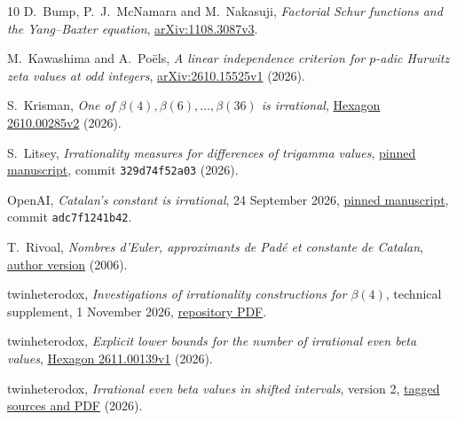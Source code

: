 \begingroup\small
\begin{thebibliography}{10}
 D.~Bump, P.~J.~McNamara and M.~Nakasuji,
\emph{Factorial Schur functions and the Yang--Baxter equation},
\href{https://arxiv.org/abs/1108.3087v3}{arXiv:1108.3087v3}.

 M.~Kawashima and A.~Po\"els,
\emph{A linear independence criterion for $p$-adic Hurwitz zeta values
at odd integers},
\href{https://arxiv.org/abs/2610.15525v1}{arXiv:2610.15525v1} (2026).

 S.~Krisman,
\emph{One of $\beta(4),\beta(6),\ldots,\beta(36)$ is irrational},
\href{https://hexagonmath.org/2610.00285v2}{Hexagon 2610.00285v2} (2026).

 S.~Litsey,
\emph{Irrationality measures for differences of trigamma values},
\href{https://github.com/slitsey/catalan-irrationality-measure/blob/329d74f52a0319af0886726271707a818022e1e0/paper-trigamma/trigamma-irrationality.pdf}{pinned manuscript},
commit \texttt{329d74f52a03} (2026).

 OpenAI, \emph{Catalan's constant is irrational},
24 September 2026,
\href{https://github.com/openai/math/blob/adc7f1241b42e322a6451854ab7e4b4c146bf78a/preprints/Catalans-constant-is-irrational-September-24-2026/paper.pdf}{pinned manuscript},
commit \texttt{adc7f1241b42}.

 T.~Rivoal,
\emph{Nombres d'Euler, approximants de Pad\'e et constante de Catalan},
\href{https://rivoal.perso.math.cnrs.fr/articles/gnew6.pdf}{author version} (2006).

 twinheterodox,
\emph{Investigations of irrationality constructions for $\beta(4)$},
technical supplement, 1 November 2026,
\href{https://github.com/twinheterodox/beta4/blob/main/output/pdf/beta4-investigations.pdf}{repository PDF}.

 twinheterodox,
\emph{Explicit lower bounds for the number of irrational even beta values},
\href{https://hexagonmath.org/2611.00139v1}{Hexagon 2611.00139v1} (2026).

 twinheterodox,
\emph{Irrational even beta values in shifted intervals}, version 2,
\href{https://github.com/twinheterodox/beta4/tree/shifted-even-beta-v2/shifted-even-beta}{tagged sources and PDF} (2026).
\end{thebibliography}
\endgroup
